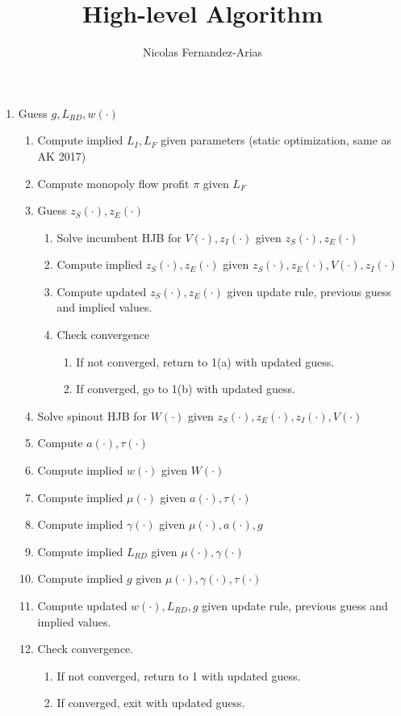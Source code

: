 \documentclass[12pt,english]{article}
\theoremstyle{remark}
\begin{document}
	
\title{High-level Algorithm}
\author{Nicolas Fernandez-Arias}
\maketitle

\begin{enumerate}
	\item Guess $g,L_{RD},w(\cdot)$
	\begin{enumerate}
		\item Compute implied $L_I,L_F$ given parameters (static optimization, same as AK 2017)
		\item Compute monopoly flow profit $\pi$ given $L_F$
		\item Guess $z_S(\cdot),z_E(\cdot)$
		\begin{enumerate}
			\item Solve incumbent HJB for $V(\cdot),z_I(\cdot)$ given $z_S(\cdot),z_E(\cdot)$
			\item Compute implied $z_S(\cdot),z_E(\cdot)$ given $z_S(\cdot),z_E(\cdot),V(\cdot),z_I(\cdot)$
			\item Compute updated $z_S(\cdot),z_E(\cdot)$ given update rule, previous guess and implied values.
			\item Check convergence
			\begin{enumerate}
				\item If not converged, return to 1(a) with updated guess.	
				\item If converged, go to 1(b) with updated guess.
			\end{enumerate}
		\end{enumerate}
		\item Solve spinout HJB for $W(\cdot)$ given $z_S(\cdot),z_E(\cdot),z_I(\cdot),V(\cdot)$
		\item Compute $a(\cdot),\tau(\cdot)$
		\item Compute implied $w(\cdot)$ given $W(\cdot)$
		\item Compute implied $\mu(\cdot)$ given $a(\cdot),\tau(\cdot)$
		\item Compute implied $\gamma(\cdot)$ given $\mu(\cdot),a(\cdot),g$
		\item Compute implied $L_{RD}$ given $\mu(\cdot),\gamma(\cdot)$
		\item Compute implied $g$ given $\mu(\cdot),\gamma(\cdot),\tau(\cdot)$
		\item Compute updated $w(\cdot),L_{RD},g$ given update rule, previous guess and implied values.
		\item Check convergence.
		\begin{enumerate}
			\item If not converged, return to 1 with updated guess.
			\item If converged, exit with updated guess.
		\end{enumerate}
	\end{enumerate}
\end{enumerate}
\end{document}
